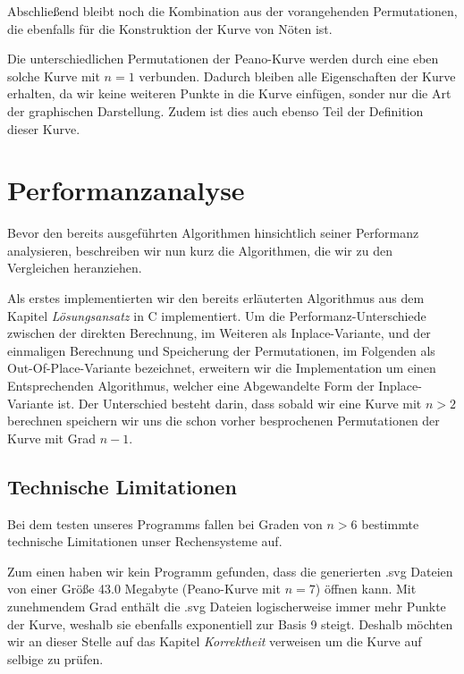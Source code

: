 \documentclass[course=asp]{aspdoc}
\begin{document}
Abschließend bleibt noch die Kombination aus der vorangehenden Permutationen, die ebenfalls f\"ur die Konstruktion der Kurve von N\"oten ist. 


Die unterschiedlichen Permutationen der Peano-Kurve werden durch eine eben solche Kurve mit $n = 1$ verbunden. Dadurch bleiben alle Eigenschaften der Kurve erhalten, da wir keine weiteren Punkte in die Kurve einf\"ugen, sonder nur die Art der graphischen Darstellung. Zudem ist dies auch ebenso Teil der Definition dieser Kurve. 


\newpage
\section{Performanzanalyse}
Bevor den bereits ausgef\"uhrten Algorithmen hinsichtlich seiner Performanz analysieren, beschreiben wir nun kurz die Algorithmen, die wir zu den Vergleichen heranziehen.

Als erstes implementierten wir den bereits erl\"auterten Algorithmus aus dem Kapitel  \textit{L\"osungsansatz} in C implementiert. Um die Performanz-Unterschiede zwischen der direkten Berechnung, im Weiteren als Inplace-Variante, und der einmaligen Berechnung und Speicherung der Permutationen, im Folgenden als Out-Of-Place-Variante bezeichnet, erweitern wir die Implementation um einen Entsprechenden Algorithmus, welcher eine Abgewandelte Form der Inplace-Variante ist. Der Unterschied besteht darin, dass sobald wir eine Kurve mit $n > 2$ berechnen speichern wir uns die schon vorher besprochenen Permutationen der Kurve mit Grad $n - 1$.

\subsection{Technische Limitationen} %
Bei dem testen unseres Programms fallen bei Graden von $n > 6$ bestimmte technische Limitationen unser Rechensysteme auf. 

Zum einen haben wir kein Programm gefunden, dass die generierten .svg Dateien von einer Gr\"oße 43.0 Megabyte (Peano-Kurve mit $n = 7$) \"offnen kann. Mit zunehmendem Grad enth\"alt die .svg Dateien logischerweise immer mehr Punkte der Kurve, weshalb sie ebenfalls exponentiell zur Basis 9 steigt. Deshalb m\"ochten wir an dieser Stelle auf das Kapitel \textit{Korrektheit} verweisen um die Kurve auf selbige zu pr\"ufen.
\end{document}
